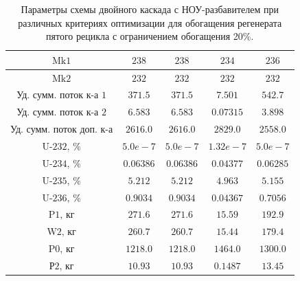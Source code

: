 \begin{table}
\begin{tabular}{ccccc}
        $\text{Mk1}$ & $238$ & $238$ & $234$ & $236$\\ \hline
        $\text{Mk2}$ & $232$ & $232$ & $232$ & $232$\\ \hline
        $\text{Уд. сумм. поток к-а 1}$ & $371.5$ & $371.5$ & $7.501$ & $542.7$\\ \hline
        $\text{Уд. сумм. поток к-а 2}$ & $6.583$ & $6.583$ & $0.07315$ & $3.898$\\ \hline
        $\text{Уд. сумм. поток доп. к-а}$ & $2616.0$ & $2616.0$ & $2829.0$ & $2558.0$\\ \hline
        $\text{U-232, \%}$ & $5.0e-7$ & $5.0e-7$ & $1.32e-7$ & $5.0e-7$\\ \hline
        $\text{U-234, \%}$ & $0.06386$ & $0.06386$ & $0.04377$ & $0.06285$\\ \hline
        $\text{U-235, \%}$ & $5.212$ & $5.212$ & $4.963$ & $5.155$\\ \hline
        $\text{U-236, \%}$ & $0.9034$ & $0.9034$ & $0.04367$ & $0.7056$\\ \hline
        $\text{P1, кг}$ & $271.6$ & $271.6$ & $15.59$ & $192.9$\\ \hline
        $\text{W2, кг}$ & $260.7$ & $260.7$ & $15.44$ & $179.4$\\ \hline
        $\text{P0, кг}$ & $1218.0$ & $1218.0$ & $1464.0$ & $1300.0$\\ \hline
        $\text{Р2, кг}$ & $10.93$ & $10.93$ & $0.1487$ & $13.45$\\ \hline
        \end{tabular}              
\caption{Параметры схемы двойного каскада с НОУ-разбавителем при различных критериях оптимизации для обогащения регенерата пятого рецикла с ограничением обогащения 20\%.{\label{2opt5_20}}}
\end{table}

